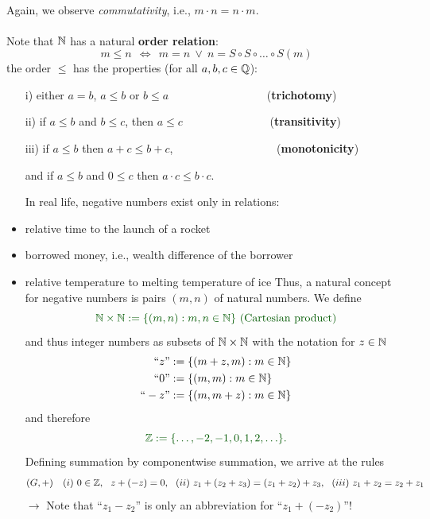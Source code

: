 {\begin{align*}
	\end{align*} 
	Again, we observe  \textit{commutativity}, i.e., {\color{satzrot}$m\cdot n=n\cdot m$}.
	~\\~\\
	Note that ${\mathbb{N}}$ has a natural \textbf{order relation}:
	\[
	m\le n~~\Leftrightarrow~~ m=n~ \vee~ n= S\circ S\circ \ldots \circ S(m)
	\]
	the order  $\le$ has the properties (for all $a,b,c\in{\mathbb{Q}}$):
	\begin{itemize}\color{defgruen}
	\item[i)] either $a=b$, $a \le b$ or $b\le a$ ~~~~~~~~~~~~~~~~~(\textbf{trichotomy})
	\item[ii)] if $a\le b$ and $b\le c$, then $a\le c$ ~~~~~~~~~~~~~~~(\textbf{transitivity})
	\item[iii)]  if $a\le b$ then $a+c\le b+c$, ~~~~~~~~~~~~~~~~~~(\textbf{monotonicity})
	\item[] and if $a\le b$ and $0\le c$ then $a\cdot c\le b\cdot c$.
	\eti
	
	In real life, negative numbers exist only in relations:
	\ite
	\item relative time to the launch of a rocket\\[-0.8cm]
	\item borrowed money, i.e., wealth difference of the borrower\\[-0.8cm]
	\item relative temperature to melting temperature of ice
	\eti
	Thus, a natural concept for negative numbers is pairs $(m,n)$ of natural numbers. We define
	\[ \color{defgruen}
	\N\times\N :=\{(m,n): m,n\in\N\} \text{ (Cartesian product)}
	\]
	and thus integer numbers as subsets of ${\mathbb{N}}\times{\mathbb{N}}$ with the notation for $z\in{\mathbb{N}}$
	\color{defgruen}
	\begin{align*}
	\text{``}z\text{''} &:= \{(m+z,m): m\in{\mathbb{N}}\}\\
	\text{``}0\text{''} &:= \{(m,m): m\in{\mathbb{N}}\}\\
	\text{``}-z\text{''} &:= \{(m,m+z): m\in{\mathbb{N}}\}
	\end{align*}
	\color{black}
	and therefore $$\color{defgruen}\Z:=\{\ldots ,-2,-1,0,1,2,\ldots\}.$$
	Defining summation by componentwise summation, we arrive at the rules
	{\color{satzrot}
		\[
		(G,+)~~~ (i)~0\in{\mathbb{Z}},~~ z+(-z)=0,~~ (ii)~z_1+(z_2+z_3)=(z_1+z_2)+z_3,~~ (iii)~z_1+z_2=z_2+z_1
		\]
		$\rightarrow$ Note that ``$z_1-z_2$'' is only an abbreviation for ``$z_1+(-z_2)$''!}
	

\end{itemize}}
